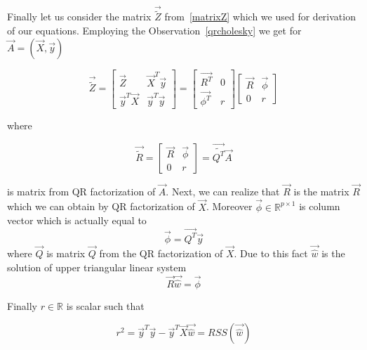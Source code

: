 Finally let us consider the matrix $\vec{\tilde{Z}}$ from~\eqref{matrixZ} which we used for derivation of our equations. Employing the Observation~\ref{qrcholesky}  we get for $\vec{A} = (\vec{X}, \vec{y})$ 

\begin{equation}
    \vec{\tilde{Z}} = 
    \begin{bmatrix}
        \vec{Z} & \vec{X}^T\vec{y} \\
    \vec{y}^T\vec{X} & \vec{y}^T\vec{y}
    \end{bmatrix} 
    = 
    \begin{bmatrix}
        \vec{R^T} & 0 \\
    \vec{\phi^T} & r
    \end{bmatrix} 
    \begin{bmatrix} 
        \vec{R} & \vec{\phi} \\
     0 & r
    \end{bmatrix} 
\end{equation}

where 

\begin{equation}
    \vec{\tilde{R}} = 
    \begin{bmatrix}
        \vec{R} & \vec{\phi} \\
     0 & r
    \end{bmatrix} 
    = \vec{\tilde{Q^T}}\vec{A}
\end{equation}

is matrix from QR factorization of $\vec{A}$. 
Next, we can realize that $\vec{R}$ is the matrix $\vec{R}$ which we can obtain by QR factorization of $\vec{X}$. 
Moreover $\vec{\phi} \in \mathbb{R}^{p \times 1}$ is column vector which is actually equal to
\begin{equation}
    \vec{\phi} =  \vec{Q^T}\vec{y}
\end{equation}
where $\vec{Q}$ is matrix $\vec{Q}$ from the QR factorization of $\vec{X}$.
Due to this fact $\vec{\hat{w}}$ is the solution of upper triangular linear system 
\begin{equation}
    \vec{R}\vec{\hat{w}} = \vec{\phi}
\end{equation}

Finally $r \in \mathbb{R}$ is scalar such that 

\begin{equation}
    r^2 = \vec{y}^T\vec{y} - \vec{y}^T\vec{X}\vec{\hat{w}} = RSS(\vec{\hat{w}})
\end{equation}

